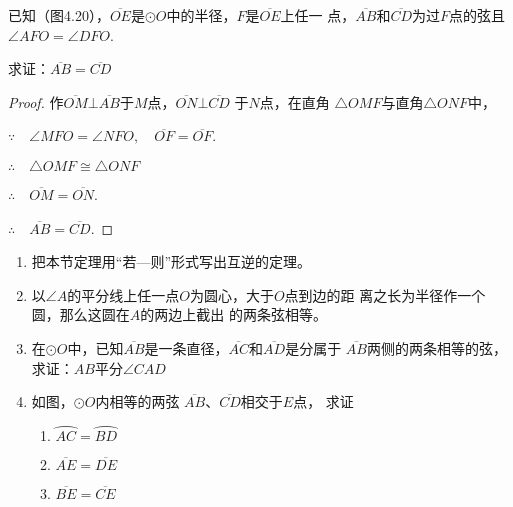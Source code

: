 \begin{example}
    已知（图4.20），$\overline{OE}$是$\odot O$中的半径，$F$是$\overline{OE}$上任一
点，$\overline{AB}$和$\overline{CD}$为过$F$点的弦且$\angle AFO=\angle DFO$.

求证：$\overline{AB}=\overline{CD}$
\end{example}

\begin{figure}[htp]
    \centering
{}
    \caption{}
\end{figure}


\begin{proof}
作$\overline{OM}\bot \overline{AB}$于$M$点，$\overline{ON}\bot \overline{CD}$ 于$N$点，在直角
$\triangle OMF$与直角$\triangle ONF$中，

$\because\quad \angle MFO=\angle NFO,\quad \overline{OF}=\overline{OF}$.

$\therefore\quad \triangle OMF\cong \triangle ONF$

$\therefore\quad \overline{OM}=\overline{ON}$.

$\therefore\quad \overline{AB}=\overline{CD}$.
\end{proof}

\begin{ex}
\begin{enumerate}
    \item 把本节定理用“若—则”形式写出互逆的定理。
    \item 以$\angle A$的平分线上任一点$O$为圆心，大于$O$点到边的距
    离之长为半径作一个圆，那么这圆在$A$的两边上截出
    的两条弦相等。
    \item 在$\odot O$中，已知$\overline{AB}$是一条直径，$\overline{AC}$和$\overline{AD}$是分属于
    $\overline{AB}$两侧的两条相等的弦，
    求证：$AB$平分$\angle CAD$
    \item 如图，$\odot O$内相等的两弦
    $\overline{AB}$、$\overline{CD}$相交于$E$点，
    求证
    \begin{enumerate}
        \item $\wideparen{AC}=\wideparen{BD}$
        \item $\overline{AE}=\overline{DE}$
        \item $\overline{BE}=\overline{CE}$
    \end{enumerate}
\end{enumerate}
\end{ex}

